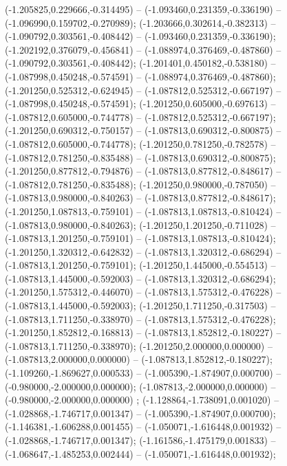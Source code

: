  (-1.205825,0.229666,-0.314495) -- (-1.093460,0.231359,-0.336190) -- (-1.096990,0.159702,-0.270989);
 (-1.203666,0.302614,-0.382313) -- (-1.090792,0.303561,-0.408442) -- (-1.093460,0.231359,-0.336190);
 (-1.202192,0.376079,-0.456841) -- (-1.088974,0.376469,-0.487860) -- (-1.090792,0.303561,-0.408442);
 (-1.201401,0.450182,-0.538180) -- (-1.087998,0.450248,-0.574591) -- (-1.088974,0.376469,-0.487860);
 (-1.201250,0.525312,-0.624945) -- (-1.087812,0.525312,-0.667197) -- (-1.087998,0.450248,-0.574591);
 (-1.201250,0.605000,-0.697613) -- (-1.087812,0.605000,-0.744778) -- (-1.087812,0.525312,-0.667197);
 (-1.201250,0.690312,-0.750157) -- (-1.087813,0.690312,-0.800875) -- (-1.087812,0.605000,-0.744778);
 (-1.201250,0.781250,-0.782578) -- (-1.087812,0.781250,-0.835488) -- (-1.087813,0.690312,-0.800875);
 (-1.201250,0.877812,-0.794876) -- (-1.087813,0.877812,-0.848617) -- (-1.087812,0.781250,-0.835488);
 (-1.201250,0.980000,-0.787050) -- (-1.087813,0.980000,-0.840263) -- (-1.087813,0.877812,-0.848617);
 (-1.201250,1.087813,-0.759101) -- (-1.087813,1.087813,-0.810424) -- (-1.087813,0.980000,-0.840263);
 (-1.201250,1.201250,-0.711028) -- (-1.087813,1.201250,-0.759101) -- (-1.087813,1.087813,-0.810424);
 (-1.201250,1.320312,-0.642832) -- (-1.087813,1.320312,-0.686294) -- (-1.087813,1.201250,-0.759101);
 (-1.201250,1.445000,-0.554513) -- (-1.087813,1.445000,-0.592003) -- (-1.087813,1.320312,-0.686294);
 (-1.201250,1.575312,-0.446070) -- (-1.087813,1.575312,-0.476228) -- (-1.087813,1.445000,-0.592003);
 (-1.201250,1.711250,-0.317503) -- (-1.087813,1.711250,-0.338970) -- (-1.087813,1.575312,-0.476228);
 (-1.201250,1.852812,-0.168813) -- (-1.087813,1.852812,-0.180227) -- (-1.087813,1.711250,-0.338970);
 (-1.201250,2.000000,0.000000) -- (-1.087813,2.000000,0.000000) -- (-1.087813,1.852812,-0.180227);
 (-1.109260,-1.869627,0.000533) -- (-1.005390,-1.874907,0.000700) -- (-0.980000,-2.000000,0.000000);
 (-1.087813,-2.000000,0.000000) -- (-0.980000,-2.000000,0.000000) ;
 (-1.128864,-1.738091,0.001020) -- (-1.028868,-1.746717,0.001347) -- (-1.005390,-1.874907,0.000700);
 (-1.146381,-1.606288,0.001455) -- (-1.050071,-1.616448,0.001932) -- (-1.028868,-1.746717,0.001347);
 (-1.161586,-1.475179,0.001833) -- (-1.068647,-1.485253,0.002444) -- (-1.050071,-1.616448,0.001932);
